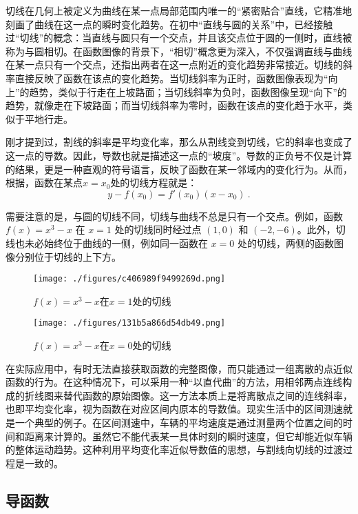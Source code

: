 切线在几何上被定义为曲线在某一点局部范围内唯一的“紧密贴合”直线，它精准地刻画了曲线在这一点的瞬时变化趋势。在初中“直线与圆的关系”中，已经接触过“切线”的概念：当直线与圆只有一个交点，并且该交点位于圆的一侧时，直线被称为与圆相切。在函数图像的背景下，“相切”概念更为深入，不仅强调直线与曲线在某一点只有一个交点，还指出两者在这一点附近的变化趋势非常接近。切线的斜率直接反映了函数在该点的变化趋势。当切线斜率为正时，函数图像表现为“向上”的趋势，类似于行走在上坡路面；当切线斜率为负时，函数图像呈现“向下”的趋势，就像走在下坡路面；而当切线斜率为零时，函数在该点的变化趋于水平，类似于平地行走。

刚才提到过，割线的斜率是平均变化率，那么从割线变到切线，它的斜率也变成了这一点的导数。因此，导数也就是描述这一点的“坡度”。导数的正负号不仅是计算的结果，更是一种直观的符号语言，反映了函数在某一邻域内的变化行为。从而，根据，函数在某点$x=x_0$处的切线方程就是：
\begin{equation}\label{eq_HsDerv_1}
y-f(x_0)=f'(x_0)(x-x_0)~.
\end{equation}

需要注意的是，与圆的切线不同，切线与曲线不总是只有一个交点。例如，函数 $f(x) = x^3 - x$ 在 $x = 1$ 处的切线同时经过点 $(1, 0)$ 和 $(-2, -6)$。此外，切线也未必始终位于曲线的一侧，例如同一函数在 $x = 0$ 处的切线，两侧的函数图像分别位于切线的上下方。

\begin{figure}[ht]
\centering
\texttt{[image: ./figures/c406989f9499269d.png]}
\caption{$f(x)=x^3-x$在$x=1$处的切线} \label{fig_HsDerv_1}
\end{figure}

\begin{figure}[ht]
\centering
\texttt{[image: ./figures/131b5a866d54db49.png]}
\caption{$f(x)=x^3-x$在$x=0$处的切线} \label{fig_HsDerv_2}
\end{figure}

在实际应用中，有时无法直接获取函数的完整图像，而只能通过一组离散的点近似函数的行为。在这种情况下，可以采用一种“以直代曲”的方法，用相邻两点连线构成的折线图来替代函数的原始图像。这一方法本质上是将离散点之间的连线斜率，也即平均变化率，视为函数在对应区间内原本的导数值。现实生活中的区间测速就是一个典型的例子。在区间测速中，车辆的平均速度是通过测量两个位置之间的时间和距离来计算的。虽然它不能代表某一具体时刻的瞬时速度，但它却能近似车辆的整体运动趋势。这种利用平均变化率近似导数值的思想，与割线向切线的过渡过程是一致的。

\subsection{导函数}\label{sub_HsDerv_2}

